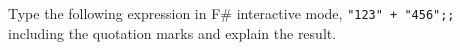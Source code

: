 Type the following expression in F\# interactive mode, \lstinline{"123" + "456";;} including the quotation marks and explain the result.